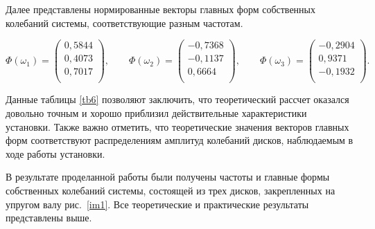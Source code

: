 \documentclass[12pt, a4paper]{article}
\begin{document}
    Далее представлены нормированные векторы главных форм собственных колебаний системы, соответствующие разным частотам.
    
    \begin{equation}
        \Phi(\omega_{1}) = 
        \begin{pmatrix}
            0,5844 \\
            0,4073 \\
            0,7017 \\
        \end{pmatrix}, \qquad
        \Phi(\omega_{2}) = 
        \begin{pmatrix}
            -0,7368 \\
            -0,1137 \\
            0,6664 \\
        \end{pmatrix}, \qquad
        \Phi(\omega_{3}) = 
        \begin{pmatrix}
            -0,2904 \\
            0,9371 \\
            -0,1932 \\
        \end{pmatrix}.
        \label{eq7}
    \end{equation}
    
    Данные таблицы \ref{tb6} позволяют заключить, что теоретический рассчет оказался довольно точным и хорошо приблизил действительные характеристики установки. Также важно отметить, что теоретические значения векторов главных форм соответствуют распределениям амплитуд колебаний дисков, наблюдаемым в ходе работы установки.
    
    В результате проделанной работы были получены частоты и главные формы собственных колебаний системы, состоящей из трех дисков, закрепленных на упругом валу рис.~\ref{im1}. Все теоретические и практические результаты представлены выше.
    
    \newpage
    
\end{document}
